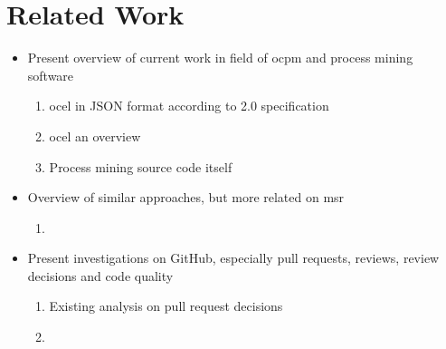 \chapter{Related Work}
\label{chap:related_work}
\begin{itemize}
	\item Present overview of current work in field of \ac{ocpm} and process mining software
	\begin{enumerate}
		\item \ac{ocel} in JSON format according to 2.0 specification \autocite{}
		\item \ac{ocel} an overview \autocite{}
		\item Process mining source code itself \autocite{DBLP:journals/sp/ZhangLLZ20}
	\end{enumerate}
	\item Overview of similar approaches, but more related on \ac{msr}
	\begin{enumerate}
		\item 
	\end{enumerate}
	\item Present investigations on GitHub, especially pull requests, reviews, review decisions and code quality
	\begin{enumerate}
		\item Existing analysis on pull request decisions \autocite{DBLP:journals/tse/ZhangYGR23}
		\item
	\end{enumerate}
\end{itemize}

